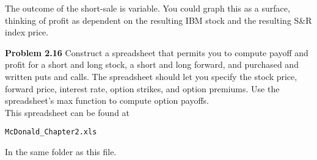 \documentclass[12pt]{article}
\newcommand{\problem}[1]{\bigskip \noindent \textbf{Problem #1}}
\theoremstyle{plain}
\begin{document}
The outcome of the short-sale is variable. You could graph this as a surface, thinking of profit as dependent on the resulting IBM stock and the resulting S\&R index price.

\problem{2.16} Construct a spreadsheet that permits you to compute payoff and profit for a short and long stock, a short and long forward, and purchased and written puts and calls. The spreadsheet should let you specify the stock price, forward price, interest rate, option strikes, and option premiums. Use the spreadsheet's max function to compute option payoffs.\\

This spreadsheet can be found at
\begin{verbatim}
McDonald_Chapter2.xls
\end{verbatim}
In the same folder as this file.
\end{document}
